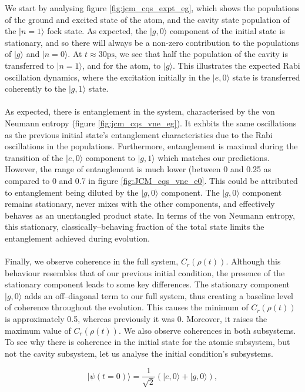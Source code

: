\documentclass[11pt]{article}
\begin{document}
We start by analysing figure \ref{fig:jcm_cqs_expt_eg}, which shows the populations of the ground and excited state of the atom, and the cavity state population of the $|n=1\rangle$ fock state. As expected, the $|g,0\rangle$ component of the initial state is stationary, and so there will always be a non-zero contribution to the populations of $|g\rangle$ and $|n=0\rangle$. At $t\approx 30\text{ps}$, we see that half the population of the cavity is transferred to $|n=1\rangle$, and for the atom, to $|g\rangle$. This illustrates the expected Rabi oscillation dynamics, where the excitation initially in the $|e,0\rangle$ state is transferred coherently to the $|g,1\rangle$ state. \\
\\
As expected, there is entanglement in the system, characterised by the von Neumann entropy (figure \ref{fig:jcm_cqs_vne_eg}). It exhbits the same oscillations as the previous initial state's entanglement characteristics due to the Rabi oscillations in the populations. Furthermore, entanglement is maximal during the transition of the $|e,0\rangle$ component to $|g,1\rangle$ which matches our predictions. However, the range of entanglement is much lower (between 0 and 0.25 as compared to 0 and 0.7 in figure \ref{fig:JCM_cqs_vne_e0}. This could be attributed to entanglement being diluted by the $|g,0\rangle$ component. The $|g,0\rangle$ component remains stationary, never mixes with the other components, and effectively behaves as an unentangled product state.
In terms of the von Neumann entropy, this stationary, classically--behaving fraction of the total state limits the entanglement achieved during evolution.\\
\\
Finally, we observe coherence in the full system, $C_r(\rho(t))$. Although this behaviour resembles that of our previous initial condition,  the presence of the stationary component leads to some key differences. The stationary component $|g,0\rangle$ adds an off--diagonal term to our full system, thus creating a baseline level of coherence throughout the evolution. This causes the minimum of $C_r(\rho(t))$ is approximately 0.5, whereas previously it was 0. Moreover, it raises the maximum value of $C_r(\rho(t))$. We also observe coherences in both subsystems. To see why there is coherence in the initial state for the atomic subsystem, but not the cavity subsystem, let us analyse the initial condition's subsystems.

\begin{equation*}
    |\psi(t=0)\rangle = \frac{1}{\sqrt{2}}\left(|e,0\rangle + |g,0\rangle\right),
\end{equation*}
\end{document}
